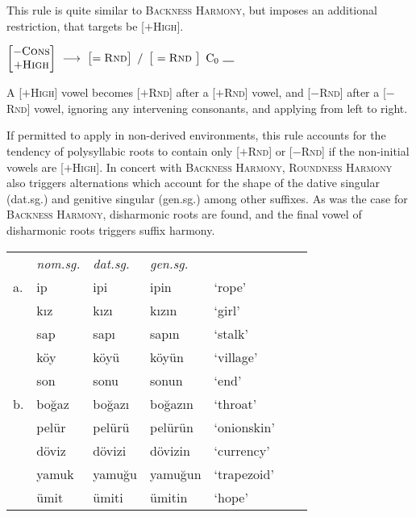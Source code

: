 This rule is quite similar to \textsc{Backness Harmony}, but imposes an additional restriction, that targets be [$+$\textsc{High}]. 

\begin{example}
$\begin{bmatrix} -\textsc{Cons} \\ +\textsc{High} \end{bmatrix}~\goesto~\begin{bmatrix} =\textsc{Rnd} \end{bmatrix}~/~\begin{bmatrix}~=\textsc{Rnd}~\end{bmatrix}~\textrm{C}_0~\gap$
\end{example}

\noindent
A [$+$\textsc{High}] vowel becomes [$+$\textsc{Rnd}] after a [$+$\textsc{Rnd}] vowel, and [$-$\textsc{Rnd}] after a [$-$\textsc{Rnd}] vowel, ignoring any intervening consonants, and applying from left to right. 

If permitted to apply in non-derived environments, this rule accounts for the tendency of polysyllabic roots to contain only [$+$\textsc{Rnd}] or [$-$\textsc{Rnd}] if the non-initial vowels are [$+$\textsc{High}]. In concert with \textsc{Backness Harmony}, \textsc{Roundness Harmony} also triggers alternations which account for the shape of the dative singular (dat.sg.) and genitive singular (gen.sg.) among other suffixes. As was the case for \textsc{Backness Harmony}, disharmonic roots are found, and the final vowel of disharmonic roots triggers suffix harmony.

\begin{example}
\begin{tabular}{lllllll}
   & \emph{nom.sg.} & \emph{dat.sg.} & \emph{gen.sg.}  \\
a. & {ip}           & {ipi}          & {ipin}         & `rope' & \citep[][216]{Clements1982} \\
   & {kız}          & {kızı}         & {kızın}        & `girl'    \\
   & {sap}          & {sapı}         & {sapın}        & `stalk'  \\
   & {köy}          & {köyü}         & {köyün}        & `village' \\
   & {son}          & {sonu}         & {sonun}        & `end'     \\
b. & {boğaz}        & {boğazı}       & {boğazın}      & `throat'  & \citep{TELL} \\
   & {pelür}        & {pelürü}       & {pelürün}      & `onionskin' \\
   & {döviz}        & {dövizi}       & {dövizin}      & `currency'  \\
   & {yamuk}        & {yamuğu}       & {yamuğun}      & `trapezoid' \\
   & {ümit}         & {ümiti}        & {ümitin}       & `hope'      \\
\end{tabular}
\end{example}

